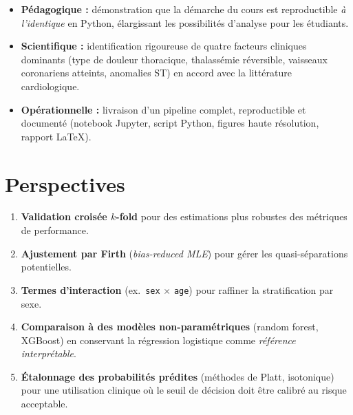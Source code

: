 \documentclass[11pt,a4paper,twoside]{report}
\theoremstyle{definition}
\begin{document}
\begin{itemize}\itemsep0.2em
  \item \textbf{Pédagogique :} démonstration que la démarche du cours
    est reproductible \emph{à l'identique} en Python, élargissant les
    possibilités d'analyse pour les étudiants.
  \item \textbf{Scientifique :} identification rigoureuse de quatre
    facteurs cliniques dominants (type de douleur thoracique,
    thalassémie réversible, vaisseaux coronariens atteints, anomalies
    ST) en accord avec la littérature cardiologique.
  \item \textbf{Opérationnelle :} livraison d'un pipeline complet,
    reproductible et documenté (notebook Jupyter, script Python,
    figures haute résolution, rapport \LaTeX{}).
\end{itemize}

\section{Perspectives}

\begin{enumerate}\itemsep0.2em
  \item \textbf{Validation croisée $k$-fold} pour des estimations plus
    robustes des métriques de performance.
  \item \textbf{Ajustement par Firth} (\emph{bias-reduced MLE}) pour
    gérer les quasi-séparations potentielles.
  \item \textbf{Termes d'interaction} (ex.\ \texttt{sex} $\times$
    \texttt{age}) pour raffiner la stratification par sexe.
  \item \textbf{Comparaison à des modèles non-paramétriques} (random
    forest, XGBoost) en conservant la régression logistique comme
    \emph{référence interprétable}.
  \item \textbf{Étalonnage des probabilités prédites}
    (méthodes de Platt, isotonique) pour une utilisation clinique
    où le seuil de décision doit être calibré au risque acceptable.
\end{enumerate}
\end{document}
